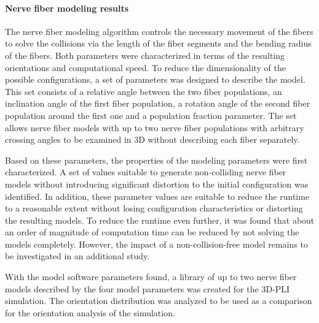 \paragraph{Nerve fiber modeling results}
%
The nerve fiber modeling algorithm controls the necessary movement of the fibers to solve the collisions via the length of the fiber segments and the bending radius of the fibers.
Both parameters were characterized in terms of the resulting orientations and computational speed.
To reduce the dimensionality of the possible configurations, a set of parameters was designed to describe the model.
This set consists of a relative angle between the two fiber populations, an inclination angle of the first fiber population, a rotation angle of the second fiber population around the first one and a population fraction parameter.
The set allows nerve fiber models with up to two nerve fiber populations with arbitrary crossing angles to be examined in 3D without describing each fiber separately.
\par
%
Based on these parameters, the properties of the modeling parameters were first characterized.
A set of values suitable to generate non-colliding nerve fiber models without introducing significant distortion to the initial configuration was identified.
In addition, these parameter values are suitable to reduce the runtime to a reasonable extent without losing configuration characteristics or distorting the resulting models.
To reduce the runtime even further, it was found that about an order of magnitude of computation time can be reduced by not solving the models completely.
However, the impact of a non-collision-free model remains to be investigated in an additional study.
\par
%
With the model software parameters found, a library of up to two nerve fiber models described by the four model parameters was created for the \ac{3D-PLI} simulation.
The orientation distribution was analyzed to be used as a comparison for the orientation analysis of the simulation.
%
%
%
